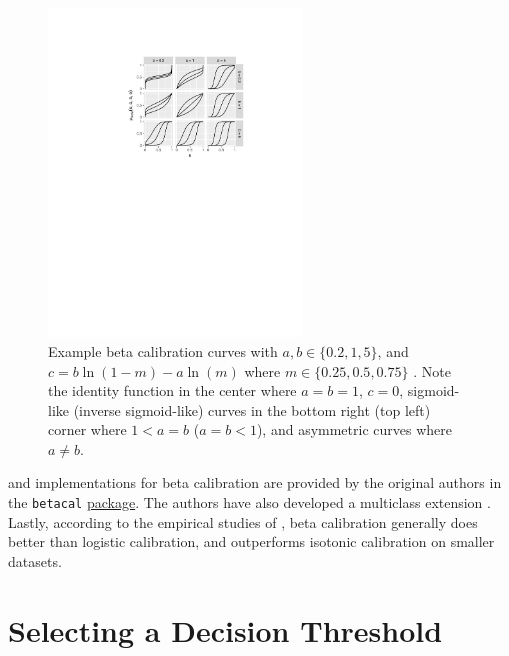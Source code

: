 \begin{figure}[H]
  \centering
  \includegraphics[width=0.6\textwidth]{figures/ml/beta_calib_curves}
\caption{
Example beta calibration curves with
$a, b \in \{0.2, 1, 5\}$,
and $c = b \ln\left(1 - m\right) - a\ln\left(m\right)$
where $m \in \{0.25, 0.5, 0.75\}$ \cite{beta_calib}.
Note the identity function in the center where $a=b=1$, $c=0$,
sigmoid-like (inverse sigmoid-like) curves in the bottom right (top left) corner
where $1<a=b$ ($a=b<1$),
and asymmetric curves where $a \neq b$.
}
\label{fig:calibration:beta_curves}
\end{figure}

\python and \R implementations for beta calibration
are provided by the original authors in the \texttt{betacal} \href{https://betacal.github.io/}{package}.
The authors have also developed a multiclass extension \cite{10.5555/3454287.3455390}.
Lastly, according to the empirical studies of \cite{beta_calib},
beta calibration generally does better than logistic calibration,
and outperforms isotonic calibration on smaller datasets.

\section{Selecting a Decision Threshold}
\label{ml_general:decision_threshold}


